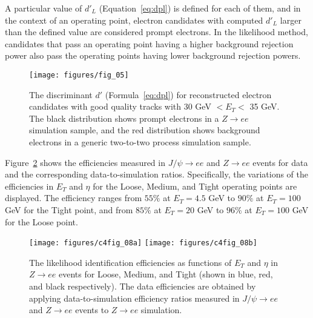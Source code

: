 A particular value of $d'_L$ (Equation~\ref{eq:dpl}) is defined for each of
them, and in the context of an operating point, electron candidates with
computed $d'_L$ larger than the defined value are considered prompt electrons.
In the likelihood method, candidates that pass an operating point having a
higher background rejection power also pass the operating points having lower
background rejection powers.

\begin{figure}[H]
	\texttt{[image: figures/fig\_05]}
	\centering

	\caption{The discriminant $d'$ (Formula~\ref{eq:dpl}) for reconstructed
		electron candidates with good quality tracks with 30 GeV $< E_T <$ 35 GeV. The
		black distribution shows prompt electrons in a $Z\to ee$ simulation sample,
		and the red distribution shows background electrons in a generic two-to-two
		process simulation sample.}

	\label{f:elcidllhd}

\end{figure}

Figure~\ref{f:ch4ideffa} shows the efficiencies measured in $J/\psi \to ee$ and
$Z\to ee$ events for data and the corresponding data-to-simulation ratios.
Specifically, the variations of the efficiencies in $E_T$ and $\eta$ for the
Loose, Medium, and Tight operating points are displayed. The efficiency ranges
from $55\%$ at $E_T= 4.5$ GeV to $90\%$ at $E_T=100$ GeV for the Tight point,
and from $85\%$ at $E_T = 20$ GeV to $96\%$ at $E_T = 100$ GeV for the Loose
point.

\begin{figure}[H]
	\texttt{[image: figures/c4fig\_08a]}
	\texttt{[image: figures/c4fig\_08b]}
	\centering

	\caption{The likelihood identification efficiencies as functions of $E_T$ and
		$\eta$ in $Z\to ee$ events for Loose, Medium, and Tight (shown in blue, red,
		and black respectively). The data efficiencies are obtained by applying
		data-to-simulation efficiency ratios measured in $J/\psi\to ee$ and $Z\to ee$
		events to $Z\to ee$ simulation.}

	\label{f:ch4ideffa}

\end{figure}


